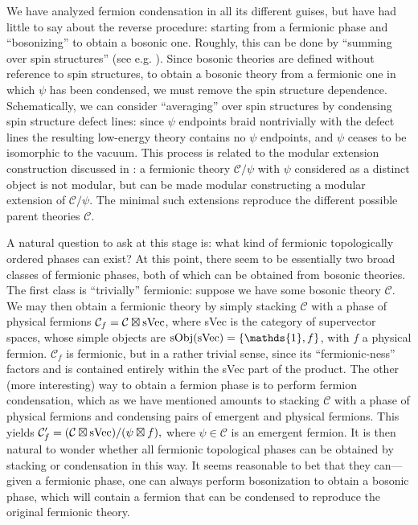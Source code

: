 \documentclass[12pt,a4paper]{article}
\newcommand{\unit}{\mathds{1}}
\newcommand{\mcc}{\mathcal{C}}
\begin{document}
We have analyzed fermion condensation in all its different guises, but have had little to say about the reverse procedure:
starting from a fermionic phase and ``bosonizing'' to obtain a bosonic one. Roughly, this can be done by 
``summing over spin structures'' (see e.g. \cite{bhardwaj2016}).
Since bosonic theories are defined without reference to spin structures, to obtain a bosonic theory from a fermionic 
one in which $\psi$ has been condensed, we must remove the spin structure dependence. 
Schematically, we can consider ``averaging'' over spin structures by condensing spin structure defect lines: since $\psi$ endpoints braid nontrivially with the defect lines the resulting low-energy theory contains no 
$\psi$ endpoints, and $\psi$ ceases to be isomorphic to the vacuum. 
This process is related to the modular extension construction discussed in \cite{Lan2016b}: a fermionic theory $\mcc /\psi$ with $\psi$ considered as a distinct object is not modular, but can be made modular
constructing a modular extension of $\mcc / \psi$. The minimal such extensions reproduce the different possible 
parent theories $\mcc$. 

A natural question to ask at this stage is: what kind of fermionic topologically ordered phases can exist? 
At this point, there seem to be essentially two broad classes of fermionic phases, both of which can be obtained from bosonic theories. 
The first class is ``trivially'' fermionic: suppose we have some bosonic theory $\mcc$. 
We may then obtain a fermionic theory by simply stacking $\mcc$ with a phase of physical fermions $\mcc_{f} = \mcc \boxtimes {\rm sVec}$, where sVec is the category of supervector spaces, whose simple objects are ${\rm sObj}({\rm sVec}) = \{\unit,f\}$, with $f$ a physical fermion. 
$\mcc_f$ is fermionic, but in a rather trivial sense, since its ``fermionic-ness'' factors and is contained entirely within the sVec part of the product. 
The other (more interesting) way to obtain a fermion phase is to perform fermion condensation, which as we have 
mentioned amounts to stacking $\mcc$ with a phase of physical fermions and condensing pairs of emergent and physical fermions. 
This yields $\mcc_f' = (\mcc \boxtimes {\rm sVec}) / (\psi \boxtimes f),$
where $\psi \in \mcc$ is an emergent fermion. 
It is then natural to wonder whether all fermionic topological phases can be obtained by stacking or condensation in this way. 
It seems reasonable to bet that they can---given a fermionic phase, one can always perform bosonization 
to obtain a bosonic phase, which will contain a fermion that can be condensed to reproduce the 
original fermionic theory. 
\end{document}
